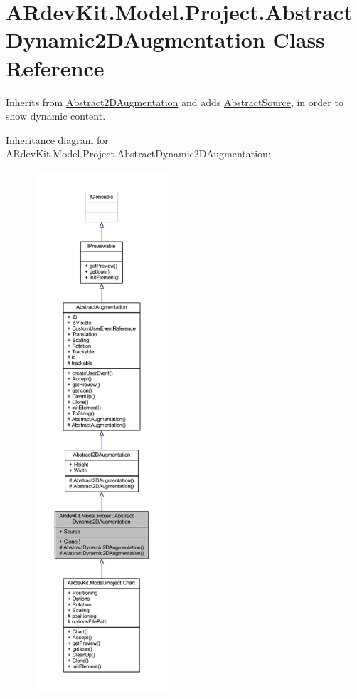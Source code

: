 \hypertarget{class_a_rdev_kit_1_1_model_1_1_project_1_1_abstract_dynamic2_d_augmentation}{\section{A\-Rdev\-Kit.\-Model.\-Project.\-Abstract\-Dynamic2\-D\-Augmentation Class Reference}
\label{class_a_rdev_kit_1_1_model_1_1_project_1_1_abstract_dynamic2_d_augmentation}
}


Inherits from \hyperlink{class_a_rdev_kit_1_1_model_1_1_project_1_1_abstract2_d_augmentation}{Abstract2\-D\-Augmentation} and adds \hyperlink{class_a_rdev_kit_1_1_model_1_1_project_1_1_abstract_source}{Abstract\-Source}, in order to show dynamic content.  




Inheritance diagram for A\-Rdev\-Kit.\-Model.\-Project.\-Abstract\-Dynamic2\-D\-Augmentation\-:
\nopagebreak
\begin{figure}[H]
\begin{center}
\leavevmode
\includegraphics[height=550pt]{class_a_rdev_kit_1_1_model_1_1_project_1_1_abstract_dynamic2_d_augmentation__inherit__graph}
\end{center}
\end{figure}



